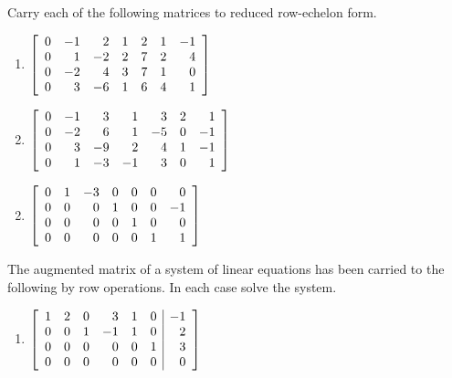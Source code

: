 \begin{multicols}{2}
\begin{ex}
Carry each of the following matrices to reduced row-echelon form.

\begin{enumerate}[label={\alph*.}]
\item 
$\left[ \begin{array}{rrrrrrr}
	0 & -1 & 2 & 1 & 2 & 1 & -1 \\
	0 & 1 & -2 & 2 & 7 & 2 & 4 \\
	0 & -2 & 4 & 3 & 7 & 1 & 0 \\
	0 & 3  &-6 & 1 & 6 & 4 & 1
\end{array} \right]$

\item 
$\left[ \begin{array}{rrrrrrr}
	0 & -1 & 3 & 1 & 3 & 2 & 1 \\
	0 & -2 & 6 & 1 & -5 & 0 & -1 \\
	0 & 3 & -9 & 2 & 4 & 1 & -1 \\
	0 & 1 & -3 & -1 & 3 & 0 & 1
\end{array} \right]$

\end{enumerate}
\begin{sol}
\begin{enumerate}[label={\alph*.}]
\setcounter{enumi}{1}
\item 
$\left[ \begin{array}{rrrrrrr}
	0 & 1 & -3 & 0 & 0 & 0 & 0 \\
	0 & 0 & 0 & 1 & 0 & 0 & -1 \\
	0 & 0 & 0 & 0 & 1 & 0 & 0 \\
	0 & 0 & 0 & 0 & 0 & 1 & 1 \\
\end{array} \right]$

\end{enumerate}
\end{sol}
\end{ex}

\begin{ex}
The augmented matrix of a system of linear equations has been carried to the following by row operations. In each case solve the system.

\begin{enumerate}[label={\alph*.}]
\item 
$\left[ \begin{array}{rrrrrr|r}
	1 & 2 & 0 & 3 & 1 & 0 & -1 \\
	0 & 0 & 1 &-1 & 1 & 0 &  2 \\
	0 & 0 & 0 & 0 & 0 & 1 &  3 \\
	0 & 0 & 0 & 0 & 0 & 0 & 0
\end{array} \right]$


\end{enumerate}
\end{ex}
\end{multicols}
